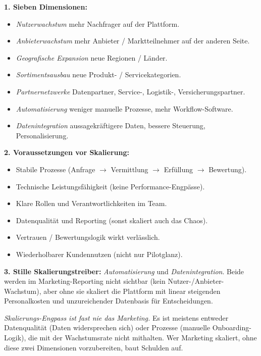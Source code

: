 \documentclass[11pt,a4paper,oneside]{article}
\begin{document}
\begin{loesungbox}
\textbf{1. Sieben Dimensionen:}
\begin{itemize}
  \item \emph{Nutzerwachstum} \textendash{} mehr Nachfrager auf der Plattform.
  \item \emph{Anbieterwachstum} \textendash{} mehr Anbieter / Marktteilnehmer auf der anderen Seite.
  \item \emph{Geografische Expansion} \textendash{} neue Regionen / Länder.
  \item \emph{Sortimentsausbau} \textendash{} neue Produkt- / Servicekategorien.
  \item \emph{Partnernetzwerke} \textendash{} Datenpartner, Service-, Logistik-, Versicherungspartner.
  \item \emph{Automatisierung} \textendash{} weniger manuelle Prozesse, mehr Workflow-Software.
  \item \emph{Datenintegration} \textendash{} aussagekräftigere Daten, bessere Steuerung, Personalisierung.
\end{itemize}

\textbf{2. Voraussetzungen vor Skalierung:}
\begin{itemize}
  \item Stabile Prozesse (Anfrage $\rightarrow$ Vermittlung $\rightarrow$ Erfüllung $\rightarrow$ Bewertung).
  \item Technische Leistungsfähigkeit (keine Performance-Engpässe).
  \item Klare Rollen und Verantwortlichkeiten im Team.
  \item Datenqualität und Reporting (sonst skaliert auch das Chaos).
  \item Vertrauen / Bewertungslogik wirkt verlässlich.
  \item Wiederholbarer Kundennutzen (nicht nur Pilotglanz).
\end{itemize}

\textbf{3. Stille Skalierungstreiber:}
\emph{Automatisierung} und \emph{Datenintegration}. Beide werden im Marketing-Reporting nicht sichtbar (kein Nutzer-/Anbieter-Wachstum), aber ohne sie skaliert die Plattform mit linear steigenden Personalkosten und unzureichender Datenbasis für Entscheidungen.

\begin{merkbox}[Managementhinweis]
\emph{Skalierungs-Engpass ist fast nie das Marketing.} Es ist meistens entweder Datenqualität (Daten widersprechen sich) oder Prozesse (manuelle Onboarding-Logik), die mit der Wachstumsrate nicht mithalten. Wer Marketing skaliert, ohne diese zwei Dimensionen vorzubereiten, baut Schulden auf.
\end{merkbox}
\end{loesungbox}
\end{document}
